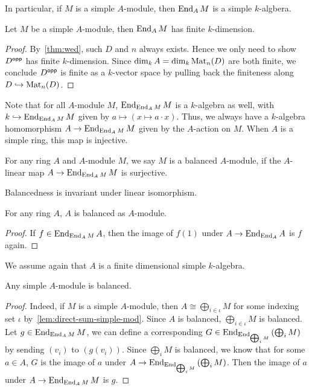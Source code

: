 \begin{remark}
  In particular, if $M$ is a simple $A$-module, then $\operatorname{End}_{A}M$ is a simple $k$-algbera.
\end{remark}

\begin{lemma}
  Let $M$ be a simple $A$-module, then $\operatorname{End}_{A}M$ has finite $k$-dimension.
  \leanok
\end{lemma}
\begin{proof}
  By~\cref{thm:wed}, such $D$ and $n$ always exists. Hence we only need to show $D^{\mathsf{opp}}$ has finite $k$-dimension. Since $\dim_{k}A=\dim_{k}\operatorname{Mat}_{n}(D)$ are both finite, we conclude $D^{\mathsf{opp}}$ is finite as a $k$-vector space by pulling back the finiteness along $D \hookrightarrow \operatorname{Mat}_{n}(D)$.
\end{proof}

\begin{remark}
Note that for all $A$-module $M$, $\operatorname{End}_{\operatorname{End}_{A}M}M$ is a $k$-algebra as well, with $k \hookrightarrow \operatorname{End}_{\operatorname{End}_{A}M}M$ given by $a \mapsto (x \mapsto a\cdot x)$. Thus, we always have a $k$-algebra homomorphism $A \to \operatorname{End}_{\operatorname{End}_{A}M}M$ given by the $A$-action on $M$. When $A$ is a simple ring, this map is injective.
\end{remark}

\begin{definition}\label{def:balanced-mod}
  \leanok
  For any ring $A$ and $A$-module $M$, we say $M$ is a balanced $A$-module, if the $A$-linear map $A \to \operatorname{End}_{\operatorname{End}_{A}M}M$ is surjective.
\end{definition}

\begin{remark}
  Balancedness is invariant under linear isomorphism.
\end{remark}

\begin{lemma}\label{lem:balanced-self}
  For any ring $A$, $A$ is balanced as $A$-module.
  \leanok
\end{lemma}
\begin{proof}
  If $f \in \operatorname{End}_{\operatorname{End}_{A}M}A$, then the image of $f(1)$ under $A \to\operatorname{End}_{\operatorname{End}_{A}}A$ is $f$ again.
\end{proof}

We assume again that $A$ is a finite dimensional simple $k$-algebra.
\begin{lemma}
  Any simple $A$-module is balanced.
  \leanok
\end{lemma}
\begin{proof}
  Indeed, if $M$ is a simple $A$-module, then $A \cong \bigoplus_{i\in\iota} M$ for some indexing set $\iota$ by~\cref{lem:direct-sum-simple-mod}. Since $A$ is balanced, $\bigoplus_{i\in\iota}M$ is balanced. Let $g \in \operatorname{End}_{\operatorname{End}_{A}M}M$, we can define a corresponding $G \in \operatorname{End}_{\operatorname{End}_{\bigoplus_{i}M}}\left(\bigoplus_{i}M\right)$ by sending $(v_{i})$ to $(g(v_{i}))$. Since $\bigoplus_{i}M$ is balanced, we know that for some $a\in A$, $G$ is the image of $a$ under $A \to \operatorname{End}_{\operatorname{End}_{\bigoplus_{i}M}}\left(\bigoplus_{i}M\right)$. Then the image of $a$ under $A \to \operatorname{End}_{\operatorname{End}_{A}M}M$ is $g$.
\end{proof}

